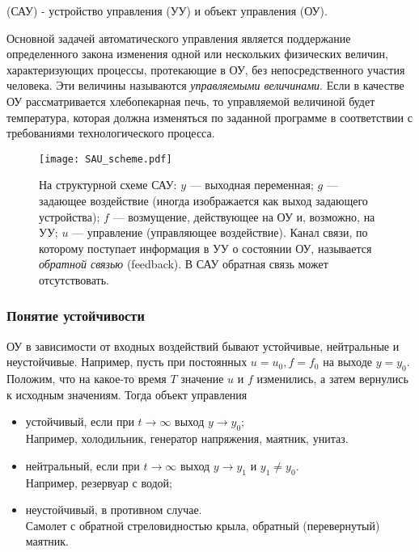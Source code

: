\documentclass[TAU.tex]{subfiles}
\begin{document}
 (САУ) - устройство управления (УУ) и объект управления (ОУ).\par
Основной задачей автоматического управления является поддержание определенного закона изменения одной или нескольких физических величин, характеризующих процессы, протекающие в ОУ, без непосредственного участия человека. Эти величины называются {\it управляемыми величинами}. Если в качестве ОУ рассматривается хлебопекарная печь, то управляемой величиной будет температура, которая должна изменяться по заданной программе в соответствии с требованиями технологического процесса. 



\begin{figure}[h]
\texttt{[image: SAU\_scheme.pdf]}
\caption{На структурной схеме САУ: $y$ --- выходная переменная; $g$ --- задающее воздействие (иногда изображается как выход задающего устройства); $f$ --- возмущение, действующее на ОУ и, возможно, на УУ; $u$ --- управление (управляющее воздействие). Канал связи, по которому поступает информация в УУ о состоянии ОУ, называется {\it обратной связью} (feedback). В САУ обратная связь может отсутствовать.}
\centering
\end{figure}

\subsubsection{Понятие устойчивости}
ОУ в зависимости от входных воздействий бывают устойчивые, нейтральные и неустойчивые. Например, пусть при постоянных $u = u_0, f = f_0$ на выходе $y = y_0$. Положим, что на какое-то время $T$ значение $u$ и $f$ изменились, а затем вернулись к исходным значениям. Тогда объект управления

\begin{itemize}
    \item устойчивый, если при $t \rightarrow \infty$ выход $y \rightarrow y_0$; \\
Например, холодильник, генератор напряжения, маятник, унитаз.
    \item нейтральный, если при $t \rightarrow \infty$ выход $y \rightarrow y_1$ и $y_1\neq y_0$. \\
Например, резервуар с водой;
    \item неустойчивый, в противном случае.\\
Самолет с обратной стреловидностью крыла, обратный (перевернутый) маятник.
\end{itemize}
\end{document}
